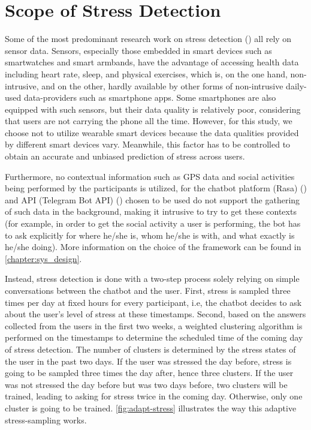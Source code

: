 \section{Scope of Stress Detection} \label{scope_stress_detection}
Some of the most predominant research work on stress detection (\cite{7_stress_detection, 8_stress_detection, 9_stress_detection}) all rely on sensor data. Sensors, especially those embedded in smart devices such as smartwatches and smart armbands, have the advantage of accessing health data including heart rate, sleep, and physical exercises, which is, on the one hand, non-intrusive, and on the other, hardly available by other forms of non-intrusive daily-used data-providers such as smartphone apps. Some smartphones are also equipped with such sensors, but their data quality is relatively poor, considering that users are not carrying the phone all the time. However, for this study, we choose not to utilize wearable smart devices because the data qualities provided by different smart devices vary. Meanwhile, this factor has to be controlled to obtain an accurate and unbiased prediction of stress across users.

Furthermore, no contextual information such as GPS data and social activities being performed by the participants is utilized, for the chatbot platform (Rasa) (\cite{10_rasa}) and API (Telegram Bot API) (\cite{11_tg_bot_api}) chosen to be used do not support the gathering of such data in the background, making it intrusive to try to get these contexts (for example, in order to get the social activity a user is performing, the bot has to ask explicitly for where he/she is, whom he/she is with, and what exactly is he/she doing). More information on the choice of the framework can be found in \autoref{chapter:sys_design}. \bigskip

Instead, stress detection is done with a two-step process solely relying on simple conversations between the chatbot and the user. First, stress is sampled three times per day at fixed hours for every participant, i.e, the chatbot decides to ask about the user’s level of stress at these timestamps. Second, based on the answers collected from the users in the first two weeks, a weighted clustering algorithm is performed on the timestamps to determine the scheduled time of the coming day of stress detection. The number of clusters is determined by the stress states of the user in the past two days. If the user was stressed the day before, stress is going to be sampled three times the day after, hence three clusters. If the user was not stressed the day before but was two days before, two clusters will be trained, leading to asking for stress twice in the coming day. Otherwise, only one cluster is going to be trained. \autoref{fig:adapt-stress} illustrates the way this adaptive stress-sampling works.

